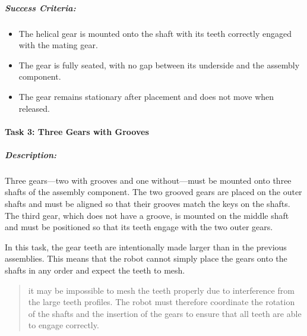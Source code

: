 \documentclass[letterpaper,10pt,english]{sphinxmanual}
\begin{document}
\subparagraph{Success Criteria:}
\label{\detokenize{robotic_instructions_gear_tasks:id3}}\begin{itemize}
\item {} 
\sphinxAtStartPar
The helical gear is mounted onto the shaft with its teeth correctly engaged with the mating gear.

\item {} 
\sphinxAtStartPar
The gear is fully seated, with no gap between its underside and the assembly component.

\item {} 
\sphinxAtStartPar
The gear remains stationary after placement and does not move when released.

\end{itemize}


\paragraph{Task 3: Three Gears with Grooves}
\label{\detokenize{robotic_instructions_gear_tasks:task-3-three-gears-with-grooves}}

\subparagraph{Description:}
\label{\detokenize{robotic_instructions_gear_tasks:id4}}
\sphinxAtStartPar
Three gears—two with grooves and one without—must be mounted onto three shafts of the assembly component.
The two grooved gears are placed on the outer shafts and must be aligned so that their grooves match the keys on the shafts.
The third gear, which does not have a groove, is mounted on the middle shaft and must be positioned so that its teeth engage with the two outer gears.

\sphinxAtStartPar
In this task, the gear teeth are intentionally made larger than in the previous assemblies.
This means that the robot cannot simply place the gears onto the shafts in any order and expect the teeth to mesh.
\begin{quote}
\begin{description}
\begin{description}
\sphinxAtStartPar
it may be impossible to mesh the teeth properly due to interference from the large teeth profiles.
The robot must therefore coordinate the rotation of the shafts and the insertion of the gears to ensure that all teeth are able to engage correctly.

\end{description}

\end{description}
\end{quote}
\end{document}
